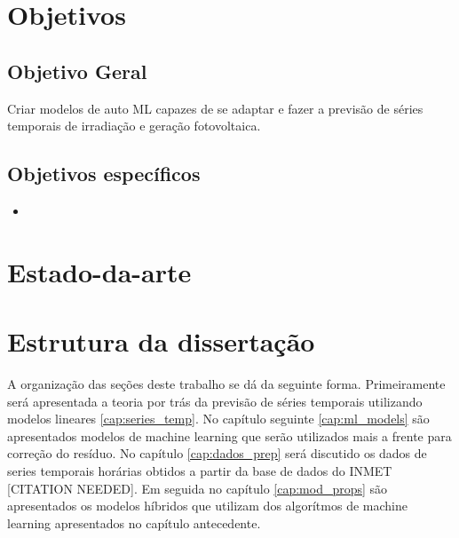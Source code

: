 \section{Objetivos}

\subsection{Objetivo Geral}

Criar modelos de auto ML capazes de se adaptar e fazer a previsão de séries temporais de irradiação e geração fotovoltaica.

\subsection{Objetivos específicos}

\begin{itemize}
    \item 
\end{itemize}

\section{Estado-da-arte}


\section{Estrutura da dissertação}

A organização das seções deste trabalho se dá da seguinte forma. Primeiramente será apresentada a teoria por trás da previsão de séries temporais utilizando modelos lineares \ref{cap:series_temp}. No capítulo seguinte \ref{cap:ml_models} são apresentados modelos de machine learning que serão utilizados mais a frente para correção do resíduo.
No capítulo \ref{cap:dados_prep} será discutido os dados de series temporais horárias obtidos a partir da base de dados do INMET [CITATION NEEDED]. Em seguida no capítulo \ref{cap:mod_props} são apresentados os modelos híbridos que utilizam dos algorítmos de machine learning apresentados no capítulo antecedente.